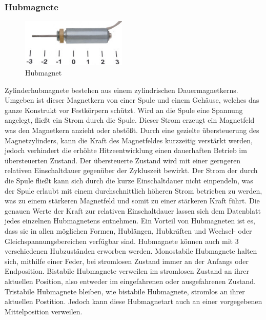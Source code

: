 \subsubsection{Hubmagnete}
\begin{figure}[H] 
\begin{center}

\includegraphics[width=5cm]{Bilder/Bauteile/Hubmagnet}
\caption{Hubmagnet}
\label{Hubmagnet}

\end{center}
\end{figure}
Zylinderhubmagnete bestehen aus einem zylindrischen Dauermagnetkerns. Umgeben ist dieser Magnetkern von einer Spule und einem Gehäuse, welches das ganze Konstrukt vor Festkörpern schützt. Wird an die Spule eine Spannung angelegt, fließt ein Strom durch die Spule. Dieser Strom erzeugt ein Magnetfeld was den Magnetkern anzieht oder abstößt. Durch eine gezielte übersteuerung des Magnetzylinders, kann die Kraft des Magnetfeldes kurzzeitig verstärkt werden, jedoch verhindert die erhöhte Hitzeentwicklung einen dauerhaften Betrieb im übersteuerten Zustand. Der übersteuerte Zustand wird mit einer gerngeren relativen Einschaltdauer gegenüber der Zykluszeit bewirkt. Der Strom der durch die Spule fließt kann sich durch die kurze Einschaltdauer nicht einpendeln, was der Spule erlaubt mit einem durchschnittlich höheren Strom betrieben zu werden, was zu einem stärkeren Magnetfeld und somit zu einer stärkeren Kraft führt. Die genauen Werte der Kraft zur relativen Einschaltdauer lassen sich dem Datenblatt jedes einzelnen Hubmagnetens entnehmen. Ein Vorteil von Hubmagneten ist es, dass sie in allen möglichen Formen, Hublängen, Hubkräften und Wechsel- oder Gleichspannungsbereichen verfügbar sind. Hubmagnete können auch mit 3 verschiedenen Hubzuständen erworben werden. Monostabile Hubmagnete halten sich, mithilfe einer Feder, bei stromlosen Zustand immer an der Anfangs oder Endposition. Bistabile Hubmagnete verweilen im stromlosen Zustand an ihrer aktuellen Position, also entweder im eingefahrenen oder ausgefahrenen Zustand. Tristabile Hubmagnete bleiben, wie bistabile Hubmagnete, stromlos an ihrer aktuellen Postition. Jedoch kann diese Hubmagnetart auch an einer vorgegebenen Mittelposition verweilen.

